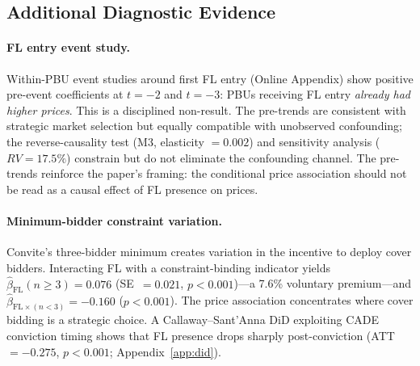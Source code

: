
\subsection{Additional Diagnostic Evidence}
\label{sec:additional_id}

\paragraph{FL entry event study.}
Within-PBU event studies around first FL entry
(Online Appendix) show
positive pre-event coefficients at $t = -2$ and $t = -3$: PBUs
receiving FL entry \emph{already had higher prices}. This is a
disciplined non-result. The pre-trends are consistent with strategic
market selection but equally compatible with unobserved confounding;
the reverse-causality test (M3, elasticity $= 0.002$) and
sensitivity analysis ($RV = 17.5\%$) constrain but do not eliminate
the confounding channel. The pre-trends reinforce the paper's
framing: the conditional price association should not be read as
a causal effect of FL presence on prices.

\paragraph{Minimum-bidder constraint variation.}
Convite's three-bidder minimum creates variation in the incentive to
deploy cover bidders. Interacting FL with a constraint-binding
indicator yields $\hat{\beta}_{\text{FL}}(n \geq 3) = 0.076$
(SE~$= 0.021$, $p < 0.001$)---a 7.6\% voluntary premium---and
$\hat{\beta}_{\text{FL} \times (n<3)} = -0.160$ ($p < 0.001$). The
price association concentrates where cover bidding is a strategic
choice. A Callaway--Sant'Anna DiD exploiting CADE conviction timing
shows that FL presence drops sharply post-conviction (ATT~$= -0.275$,
$p < 0.001$; Appendix~\ref{app:did}).
